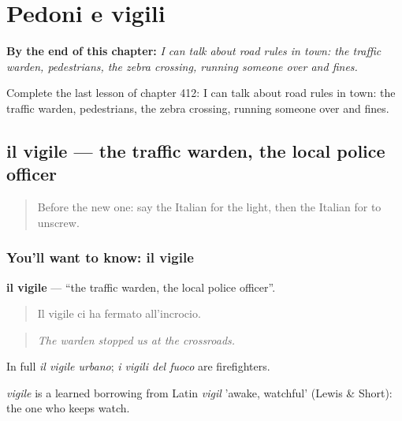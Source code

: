 
\chapter{Pedoni e vigili}
\label{ch:it-pedoni-e-vigili}

\begin{chapteropening}
\textbf{By the end of this chapter:} \emph{I can talk about road rules in town: the traffic warden, pedestrians, the zebra crossing, running someone over and fines.}

Complete the last lesson of chapter 412: I can talk about road rules in town: the traffic warden, pedestrians, the zebra crossing, running someone over and fines.
\end{chapteropening}

\section[il vigile]{il vigile — the traffic warden, the local police officer}

\label{lesson:IT-C412-vigile}



\begin{quote}
Before the new one: say the Italian for the light, then the Italian for to unscrew.
\end{quote}

\subsection*{You'll want to know: il vigile}
\textbf{il vigile} — \textquotedblleft{}the traffic warden, the local police officer\textquotedblright{}.

\begin{quote}
Il vigile ci ha fermato all'incrocio.
\end{quote}

\begin{quote}
\emph{The warden stopped us at the crossroads.}
\end{quote}

In full \emph{il vigile urbano}; \emph{i vigili del fuoco} are firefighters.

\begin{cousinweb}
\emph{vigile} is a learned borrowing from Latin \emph{vigil} 'awake, watchful' (Lewis \& Short): the one who keeps watch.
\end{cousinweb}

